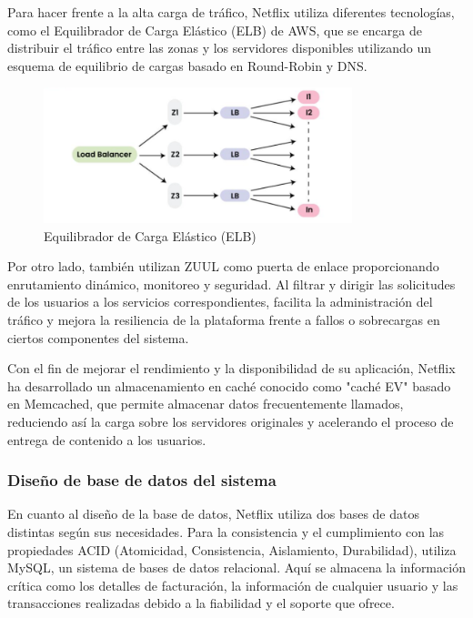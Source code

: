 \documentclass[12pt,a4paper]{article}
\begin{document}
    Para hacer frente a la alta carga de tráfico, Netflix utiliza diferentes tecnologías, como el Equilibrador de Carga Elástico (ELB) de AWS, que se encarga de distribuir el tráfico entre las zonas y los servidores disponibles utilizando un esquema de equilibrio de cargas basado en Round-Robin y DNS.

    \begin{figure}[H]
        \centering
        \includegraphics[width=0.8\textwidth]{./img/equilibrador_carga_elastico_netflix.png}
        \caption{Equilibrador de Carga Elástico (ELB)}
        \label{fig:netflix_elb}
    \end{figure}

    Por otro lado, también utilizan ZUUL como puerta de enlace proporcionando enrutamiento dinámico, monitoreo y seguridad. Al filtrar y dirigir las solicitudes de los usuarios a los servicios correspondientes, facilita la administración del tráfico y mejora la resiliencia de la plataforma frente a fallos o sobrecargas en ciertos componentes del sistema. \cite{hoff2018}

    Con el fin de mejorar el rendimiento y la disponibilidad de su aplicación, Netflix ha desarrollado un almacenamiento en caché conocido como "caché EV" basado en Memcached, que permite almacenar datos frecuentemente llamados, reduciendo así la carga sobre los servidores originales y acelerando el proceso de entrega de contenido a los usuarios.

    \subsubsection{Diseño de base de datos del sistema}

    En cuanto al diseño de la base de datos, Netflix utiliza dos bases de datos distintas según sus necesidades. Para la consistencia y el cumplimiento con las propiedades ACID (Atomicidad, Consistencia, Aislamiento, Durabilidad), utiliza MySQL, un sistema de bases de datos relacional. Aquí se almacena la información crítica como los detalles de facturación, la información de cualquier usuario y las transacciones realizadas debido a la fiabilidad y el soporte que ofrece.
\end{document}
